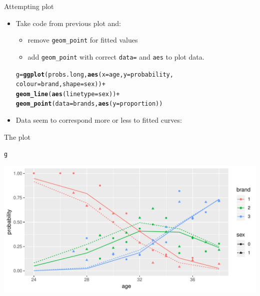 \documentclass[unknownkeysallowed]{beamer}\usepackage[]{graphicx}\usepackage[]{color}
\makeatletter
\def\maxwidth{ %
  \ifdim\Gin@nat@width>\linewidth
    \linewidth
  \else
    \Gin@nat@width
  \fi
}
\newcommand{\hlopt}[1]{\textcolor[rgb]{0,0,0}{#1}}%
\newcommand{\hlstd}[1]{\textcolor[rgb]{0.345,0.345,0.345}{#1}}%
\newcommand{\hlkwb}[1]{\textcolor[rgb]{0.69,0.353,0.396}{#1}}%
\newcommand{\hlkwc}[1]{\textcolor[rgb]{0.333,0.667,0.333}{#1}}%
\newcommand{\hlkwd}[1]{\textcolor[rgb]{0.737,0.353,0.396}{\textbf{#1}}}%
\newenvironment{kframe}{%
 \def\at@end@of@kframe{}%
 \ifinner\ifhmode%
  \def\at@end@of@kframe{\end{minipage}}%
  \begin{minipage}{\columnwidth}%
 \fi\fi%
 \def\FrameCommand##1{\hskip\@totalleftmargin \hskip-\fboxsep
 \colorbox{shadecolor}{##1}\hskip-\fboxsep
     \hskip-\linewidth \hskip-\@totalleftmargin \hskip\columnwidth}%
 \MakeFramed {\advance\hsize-\width
   \@totalleftmargin\z@ \linewidth\hsize
   \@setminipage}}%
 {\par\unskip\endMakeFramed%
 \at@end@of@kframe}
\newenvironment{knitrout}{}{} %
\makeatother
\begin{document}
\begin{frame}[fragile]{Attempting plot}
  
  \begin{itemize}
  \item Take code from previous plot and:
    \begin{itemize}
    \item remove \texttt{geom\_point} for fitted values
    \item add \texttt{geom\_point} with correct \texttt{data=} and
      \texttt{aes} to plot data.
    \end{itemize}
    
\begin{knitrout}
\color{fgcolor}\begin{kframe}
\begin{alltt}
\hlstd{g}\hlkwb{=}\hlkwd{ggplot}\hlstd{(probs.long,}\hlkwd{aes}\hlstd{(}\hlkwc{x}\hlstd{=age,}\hlkwc{y}\hlstd{=probability,}
  \hlkwc{colour}\hlstd{=brand,}\hlkwc{shape}\hlstd{=sex))}\hlopt{+}
  \hlkwd{geom_line}\hlstd{(}\hlkwd{aes}\hlstd{(}\hlkwc{linetype}\hlstd{=sex))}\hlopt{+}
  \hlkwd{geom_point}\hlstd{(}\hlkwc{data}\hlstd{=brands,}\hlkwd{aes}\hlstd{(}\hlkwc{y}\hlstd{=proportion))}
\end{alltt}
\end{kframe}
\end{knitrout}

\item Data seem to correspond more or less to fitted curves:
  \end{itemize}
  
\end{frame}

\begin{frame}[fragile]{The plot}
  
\begin{knitrout}
\color{fgcolor}\begin{kframe}
\begin{alltt}
\hlstd{g}
\end{alltt}
\end{kframe}
\includegraphics[width=\maxwidth]{figure/unnamed-chunk-116-1} 

\end{knitrout}
\end{frame}
\end{document}
